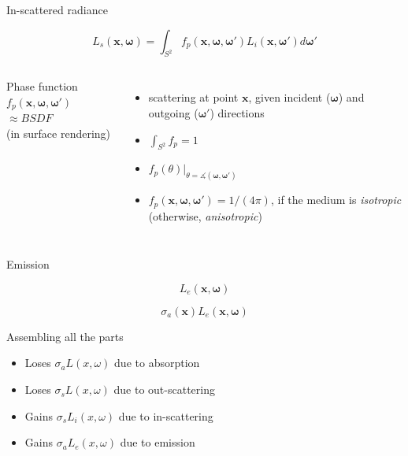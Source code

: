 \documentclass[
  english,            %
  aspectratio=169,    %
]{tumbeamer}
\newcommand\bx[0]{\bm{x}}
\newcommand\bomega[0]{\bm{\omega}}
\begin{document}
\begin{frame}{In-scattered radiance}
\begin{figure}[ht]
    \centering
    \scalebox{.6}{
        
    }
\end{figure}
$$ L_s(\bx, \bomega) = \int_{S^2} f_p(\bx, \bomega, \bomega') L_i(\bx, \bomega')
    d\bomega' $$

\begin{columns}[t, onlytextwidth]
    Phase function $f_p(\bx, \bomega, \bomega')$ \\
    \vspace{.3em}
    \scriptsize{$\approx BSDF$ \\(in surface rendering)}
    \begin{itemize}
        \item scattering at point $\bx$, given incident ($\bomega$) and outgoing
            ($\bomega'$) directions
        \item $\int_{S^2} f_p = 1$
        \item $f_p(\theta)\big|_{\theta = \measuredangle(\bomega, \bomega')}$
        \item $f_p(\bx, \bomega, \bomega') = 1/(4\pi)$, if the medium is
            \textit{isotropic}\\\hfill(otherwise, \textit{anisotropic})
    \end{itemize}
\end{columns}

\end{frame}


\begin{frame}{Emission}
\begin{figure}[ht]
    \centering
        
\end{figure}
$$L_e(\bx, \bomega)$$

$$\sigma_a(\boldsymbol{x})L_e(\bx, \bomega)$$
\end{frame}

\begin{frame}{Assembling all the parts}
    \begin{figure}[ht]
        \centering
        
        \label{fig:interactions}
    \end{figure}
    \begin{itemize}
        \item Loses $\sigma_a L(x, \omega)$ due to absorption
        \item Loses $\sigma_s L(x, \omega)$ due to out-scattering
        \item Gains $\sigma_s L_i(x, \omega)$ due to in-scattering
        \item Gains $\sigma_a L_e(x, \omega)$ due to emission
    \end{itemize}
\end{frame}
\end{document}
